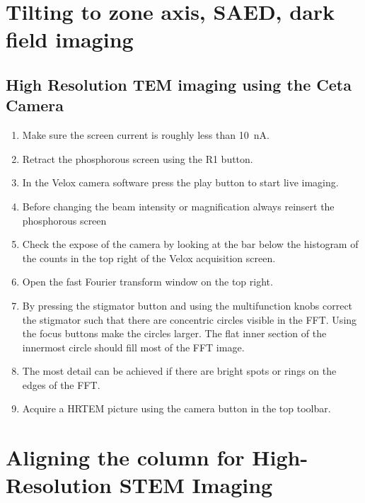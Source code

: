 \documentclass[a4paper]{scrartcl}
\begin{document}
\section*{Tilting to zone axis, SAED, dark field imaging}

\subsection*{High Resolution TEM imaging using the Ceta Camera}
\begin{enumerate}
	\item Make sure the screen current is roughly less than \SI{10}{\nano \ampere}.
	\item Retract the phosphorous screen using the R1 button.
	\item In the Velox camera software press the play button to start live imaging.
	\item Before changing the beam intensity or magnification always reinsert the phosphorous screen
	\item Check the expose of the camera by looking at the bar below the histogram of the counts in the top right of the Velox acquisition screen.
	\item Open the fast Fourier transform window on the top right.
	\item By pressing the stigmator button and using the multifunction knobs correct the stigmator such that there are concentric circles visible in the FFT. Using the focus buttons make the circles larger. The flat inner section of the innermost circle should fill most of the FFT image.
	\item The most detail can be achieved if there are bright spots or rings on the edges of the FFT.
	\item Acquire a HRTEM picture using the camera button in the top toolbar.
\end{enumerate}

\section*{Aligning the column for High-Resolution STEM Imaging}
\end{document}
